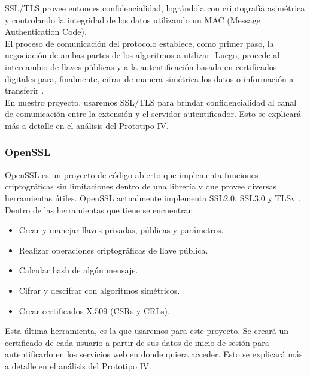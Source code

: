 \documentclass[12pt, a4paper, titlepage]{report}
\begin{document}
                SSL/TLS provee entonces confidencialidad, lográndola con criptografía asimétrica y controlando la integridad de los datos utilizando un MAC (Message Authentication Code).\\
                
                El proceso de comunicación del protocolo establece, como primer paso, la negociación de ambas partes de los algoritmos a utilizar. Luego, procede al intercambio de llaves públicas y a la autentificación basada en certificados digitales para, finalmente, cifrar de manera simétrica los datos o información a transferir \cite{refCriptografia}.\\
                
                En nuestro proyecto, usaremos SSL/TLS para brindar confidencialidad al canal de comunicación entre la extensión y el servidor autentificador. Esto se explicará más a detalle en el análisis del Prototipo IV.
                
                \subsubsection{OpenSSL}
	            OpenSSL es un proyecto de código abierto que implementa funciones criptográficas sin limitaciones dentro de una librería y que provee diversas herramientas útiles. OpenSSL actualmente implementa SSL2.0, SSL3.0 y TLSv \cite{refCriptografia}.\\
	            
	            Dentro de las herramientas que tiene se encuentran: 
	            \begin{itemize}
	                \item Crear y manejar llaves privadas, públicas y parámetros.
	                \item Realizar operaciones criptográficas de llave pública.
	                \item Calcular hash de algún mensaje.
	                \item Cifrar y descifrar con algoritmos simétricos.
	                \item Crear certificados X.509 (CSRs y CRLs).
	            \end{itemize}
	            
	            Esta última herramienta, es la que usaremos para este proyecto. Se creará un certificado de cada usuario a partir de sus datos de inicio de sesión para autentificarlo en los servicios web en donde quiera acceder. Esto se explicará más a detalle en el análisis del Prototipo IV.
	            
\end{document}
